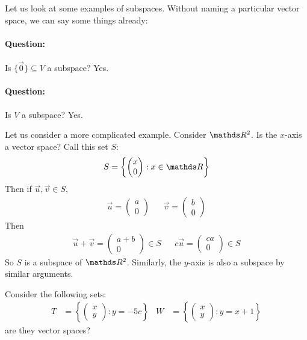 \documentclass[11pt]{article}
\newcommand{\ques}{\paragraph{Question:}}
\newcommand{\vek}[1]{\vec{#1}}
\begin{document}
\vspace{1cm}

Let us look at some examples of subspaces. Without naming a particular vector space, we can say some things already:
\ques Is $\{ \vek{0} \} \subseteq V$ a subspace? Yes. %
\ques Is $V$ a subspace? Yes.

\vspace{1cm}

Let us consider a more complicated example. Consider $\bbR^2$. Is the $x$-axis a vector space? Call this set $S$:
\begin{align*}
S = \left\{ \begin{pmatrix}x \\ 0\end{pmatrix} : x \in \bbR \right\}
\end{align*}
Then if $\vek{u}, \vek{v} \in S$,
\begin{align*}
\vek{u} = \begin{pmatrix}a \\ 0\end{pmatrix}
&&
\vek{v} = \begin{pmatrix}b \\ 0\end{pmatrix}
\end{align*}
Then
\begin{align*}
\vek{u} + \vek{v} = \begin{pmatrix}a+b \\ 0\end{pmatrix} \in S
&&
c \vek{u} = \begin{pmatrix}c a \\ 0\end{pmatrix} \in S
\end{align*}
So $S$ is a subspace of $\bbR^2$. Similarly, the $y$-axis is also a subspace by similar arguments.

\vspace{1cm}

Consider the following sets:
\begin{align*}
T &= \left\{ \begin{pmatrix}x \\ y\end{pmatrix} : y = -5 c \right\}
&
W &= \left\{ \begin{pmatrix}x \\ y\end{pmatrix} : y = x+1 \right\}
\end{align*}
are they vector spaces?
\end{document}
